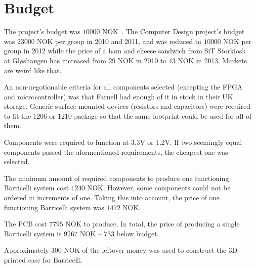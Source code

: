 \section{Budget}
The project's budget was $10 000$ NOK~\cite{assignment-text}.
The Computer Design project's budget was $23000$ NOK per group in 2010 and 2011, and was reduced to $10 000$ NOK per group in 2012\cite{previous-projects} while the price of a ham and cheese sandwich from SiT Storkiosk at Gløshaugen has increased from $29$ NOK in 2010 to $43$ NOK in 2013.
Markets are weird like that.

An non-negotionable criteria for all components selected (excepting the FPGA and microcontroller) was that Farnell had enough of it in stock in their UK storage.
Generic surface mounted devices (resistors and capacitors) were required to fit the 1206 or 1210 package so that the same footprint could be used for all of them.

Components were required to function at $3.3$V or $1.2$V.
If two seemingly equal components passed the aformentioned requirements, the cheapest one was selected.

The minimum amount of required components to produce one functioning Barricelli system cost $1240$ NOK.
However, some components could not be ordered in increments of one.
Taking this into account, the price of one functioning Barricelli system was $1472$ NOK.

The PCB cost $7795$ NOK to produce.
In total, the price of producing a single Barricelli system is $9267$ NOK -- $733$ below budget.

Approximately $300$ NOK of the leftover money was used to construct the 3D-printed case for Barricelli.


